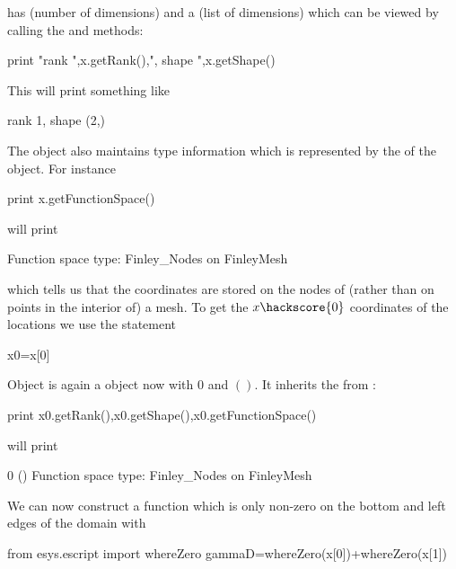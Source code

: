  has \Rank (number of dimensions) and a \Shape (list of dimensions) which can be viewed by 
calling the  and  methods:
\begin{python}
  print "rank ",x.getRank(),", shape ",x.getShape()
\end{python}
This will print something like
\begin{python}
  rank 1, shape (2,)
\end{python}
The \Data object also maintains type information which is represented by the 
\FunctionSpace of the object. For instance
\begin{python}
  print x.getFunctionSpace()
\end{python}
will print 
\begin{python}
  Function space type: Finley_Nodes on FinleyMesh 
\end{python}
which tells us that the coordinates are stored on the nodes of (rather than on points in the interior of) a \finley mesh.
To get the  $x\hackscore{0}$ coordinates of the locations we use the
statement 
\begin{python}
  x0=x[0]
\end{python}
Object  
is again a \Data object now with \Rank $0$ and 
\Shape $()$. It inherits the \FunctionSpace from :
\begin{python}
  print x0.getRank(),x0.getShape(),x0.getFunctionSpace()
\end{python}
will print
\begin{python}
  0 () Function space type: Finley_Nodes on FinleyMesh 
\end{python}
We can now construct a function  which is only non-zero on the bottom and left edges
of the domain with
\begin{python}
  from esys.escript import whereZero
  gammaD=whereZero(x[0])+whereZero(x[1])
\end{python}

